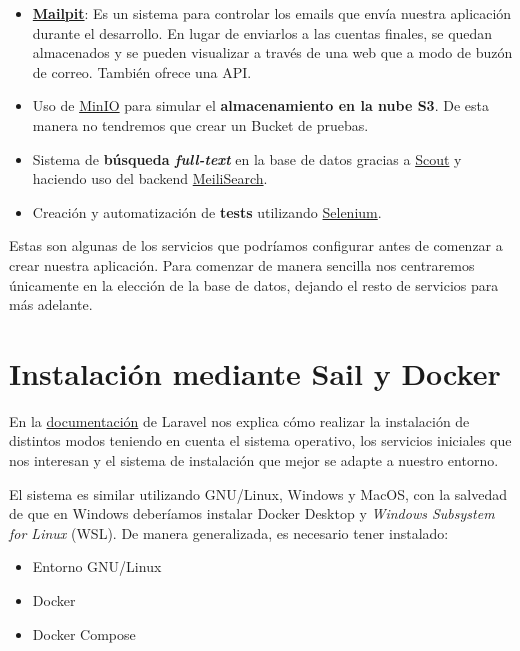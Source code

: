 \begin{itemize}
    \item \textbf{\href{https://github.com/axllent/mailpit}{Mailpit}}: Es un sistema para controlar los emails que envía nuestra aplicación durante el desarrollo. En lugar de enviarlos a las cuentas finales, se quedan almacenados y se pueden visualizar a través de una web que a modo de buzón de correo. También ofrece una API.

    \item Uso de  \href{https://min.io/}{MinIO} para simular el \textbf{almacenamiento en la nube S3}. De esta manera no tendremos que crear un Bucket de pruebas.

    \item Sistema de \textbf{búsqueda \textit{full-text}} en la base de datos gracias a \href{https://laravel.com/docs/10.x/scout#introduction}{Scout} y haciendo uso del backend \href{https://www.meilisearch.com/}{MeiliSearch}.

    \item Creación y automatización de \textbf{tests} utilizando \href{https://www.selenium.dev/}{Selenium}.
\end{itemize}

Estas son algunas de los servicios que podríamos configurar antes de comenzar a crear nuestra aplicación. Para comenzar de manera sencilla nos centraremos únicamente en la elección de la base de datos, dejando el resto de servicios para más adelante.


\section{Instalación mediante Sail y Docker}

En la \href{https://laravel.com/docs/10.x/installation}{documentación} de Laravel nos explica cómo realizar la instalación de distintos modos teniendo en cuenta el sistema operativo, los servicios iniciales que nos interesan y el sistema de instalación que mejor se adapte a nuestro entorno.


El sistema es similar utilizando GNU/Linux, Windows y MacOS, con la salvedad de que en Windows deberíamos instalar Docker Desktop y \textit{Windows Subsystem for Linux} (WSL). De manera generalizada, es necesario tener instalado:

\begin{itemize}
    \item Entorno GNU/Linux
    \item Docker
    \item Docker Compose
\end{itemize}

